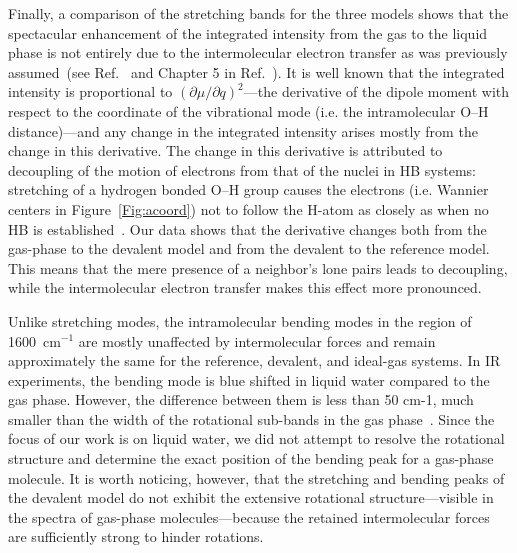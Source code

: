 \documentclass[journal=jacsat,manuscript=article]{achemso}
\begin{document}

Finally, a comparison of the stretching bands for the three models shows that the spectacular enhancement of the integrated intensity from the gas to the liquid phase is not entirely due to the intermolecular electron transfer as was previously assumed~(see Ref.~ and Chapter 5 in Ref.~). 
It is well known that the integrated intensity is proportional to $\left({\partial \mu}/{\partial q}\right)^2$---the derivative of the dipole moment with respect to the coordinate of the vibrational mode (i.e. the intramolecular O--H distance)---and any change in the integrated intensity arises mostly from the change in this derivative. 
The change in this derivative is attributed to decoupling of the motion of electrons from that of the nuclei in HB systems: stretching of a hydrogen bonded O--H group causes the electrons (i.e. Wannier centers in Figure~\ref{Fig:acoord}) not to follow the H-atom as closely as when no HB is established~\cite{marechal2006hydrogen}. 
Our data shows that the derivative changes both from the gas-phase to the devalent model and from the devalent to the reference model. 
This means that the mere presence of a neighbor's lone pairs leads to decoupling, while the intermolecular electron transfer makes this effect more pronounced.


Unlike stretching modes, the intramolecular bending modes in the region of 1600~cm$^{-1}$ are mostly unaffected by intermolecular forces and remain approximately the same for the reference, devalent, and ideal-gas systems. 
In IR experiments, the bending mode is blue shifted in liquid water compared to the gas phase. However, the difference between them is less than 50 cm-1, much smaller than the width of the rotational sub-bands in the gas phase~\cite{marechal2006hydrogen}. Since the focus of our work is on liquid water, we did not attempt to resolve the rotational structure and determine the exact position of the bending peak for a gas-phase molecule.
It is worth noticing, however, that the stretching and bending peaks of the devalent model do not exhibit the extensive rotational structure---visible in the spectra of gas-phase molecules---because the retained intermolecular forces are sufficiently strong to hinder rotations.
\end{document}
